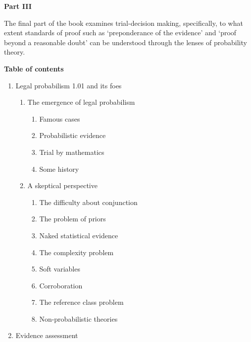 \documentclass[10pt,dvipsnames,enabledeprecatedfontcommands]{scrartcl}
\begin{document}
\vspace{3mm}

\noindent \textbf{Part III}

The final part of the book examines trial-decision making, specifically,
to what extent standards of proof such as `preponderance of the
evidence' and `proof beyond a reasonable doubt' can be understood
through the lenses of probability theory.

\vspace{3mm}

\noindent \textbf{Table of contents}

\renewcommand{\labelenumi}{\Roman{enumi}}
\renewcommand{\labelenumii}{\arabic{enumii}}
\renewcommand{\labelenumiii}{\arabic{enumii}.\arabic{enumiii}}

\begin{enumerate}
\item Legal probabilism 1.01 and its foes
\begin{enumerate}

  \item The emergence of legal probabilism
  \begin{enumerate}
  \item  Famous cases
  \item  Probabilistic evidence
  \item  Trial by mathematics
  \item  Some history
  \end{enumerate}
  

  
  \item  A skeptical perspective
  \begin{enumerate}
  \item  The difficulty about conjunction
  \item  The problem of priors
  \item  Naked statistical evidence
  \item  The complexity problem
  \item  Soft variables
  \item  Corroboration
  \item  The reference class problem
  \item  Non-probabilistic theories
  \end{enumerate}


\end{enumerate}
\item  Evidence assessment


\begin{enumerate}



\end{enumerate}
\end{enumerate}
\end{document}
